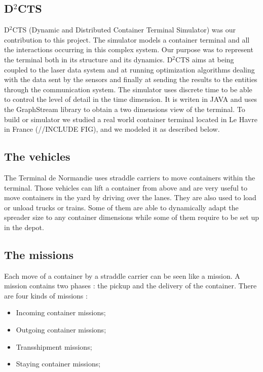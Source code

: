 \documentclass[a4paper,10pt]{article}
\begin{document}
\subsection{D$^2$CTS}
D$^2$CTS (Dynamic and Distributed Container Terminal Simulator)\cite{Lesauvage2011} was our contribution to this project. The simulator models a container terminal and all the interactions occurring in this complex system. Our purpose was to represent the terminal both in its structure and its dynamics. D$^2$CTS aims at being coupled to the laser data system and at running optimization algorithms dealing with the data sent by the sensors and finally at sending the results to the entities through the communication system.
The simulator uses discrete time to be able to control the level of detail in the time dimension. It is writen in JAVA and uses the GraphStream\cite{Pigne2008} library to obtain a two dimensions view of the terminal. To build or simulator we studied a real world container terminal located in Le Havre in France (//INCLUDE FIG), and we modeled it as described below.

\subsection{The vehicles}
The Terminal de Normandie uses straddle carriers to move containers within the terminal. Those vehicles can lift a container from above and are very useful to move containers in the yard by driving over the lanes. They are also used to load or unload trucks or trains. Some of them are able to dynamically adapt the spreader size to any container dimensions while some of them require to be set up in the depot.%
\subsection{The missions}
Each move of a container by a straddle carrier can be seen like a mission. A mission contains two phases : the pickup and the delivery of the container. There are four kinds of missions :
\begin{itemize}
	\item Incoming container missions;
	\item Outgoing container missions;
	\item Transshipment missions;
	\item Staying container missions;
\end{itemize}
\end{document}
